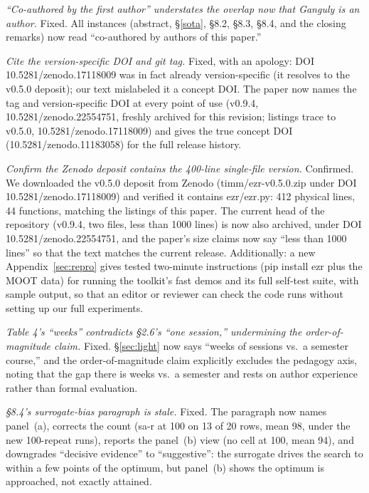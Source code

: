 \documentclass[AMA,STIX2COL]{WileyNJDv5}
\begin{document}
\smallskip{} {\em ``Co-authored by the first author''
understates the overlap now that Ganguly is an author.} Fixed.
All instances (abstract, \S\ref{sota}, \S8.2, \S8.3, \S8.4, and
the closing remarks) now read ``co-authored by authors of this
paper.''

\smallskip{} {\em Cite the version-specific DOI and git
tag.} Fixed, with an apology: DOI
\textsf{10.5281/zenodo.17118009} was in fact already
version-specific (it resolves to the \textsf{v0.5.0} deposit);
our text mislabeled it a concept DOI. The paper now names the
tag and version-specific DOI at every point of use
(\textsf{v0.9.4}, \textsf{10.5281/zenodo.22554751}, freshly
archived for this revision; listings trace to \textsf{v0.5.0},
\textsf{10.5281/zenodo.17118009}) and gives the true concept
DOI (\textsf{10.5281/zenodo.11183058}) for the full release
history.

\smallskip{} {\em Confirm the Zenodo deposit contains the
400-line single-file version.} Confirmed. We downloaded the
\textsf{v0.5.0} deposit from Zenodo
(\textsf{timm/ezr-v0.5.0.zip} under DOI
\textsf{10.5281/zenodo.17118009}) and verified it contains
\textsf{ezr/ezr.py}: 412 physical lines, 44 functions, matching
the listings of this paper. The current head of the repository
(\textsf{v0.9.4}, two files, less than 1000 lines) is now also
archived, under DOI \textsf{10.5281/zenodo.22554751}, and the
paper's size claims now say ``less than 1000 lines'' so that the
text matches the current release. Additionally: a new Appendix~\ref{sec:repro} gives tested
two-minute instructions (\textsf{pip install ezr} plus the MOOT
data) for running the toolkit's fast demos and its full self-test
suite, with sample output, so that an editor or reviewer can
check the code runs without setting up our full experiments.

\smallskip{} {\em Table 4's ``weeks'' contradicts \S2.6's
``one session,'' undermining the order-of-magnitude claim.}
Fixed. \S\ref{sec:light} now says ``weeks of sessions vs.\ a
semester course,'' and the order-of-magnitude claim explicitly
excludes the pedagogy axis, noting that the gap there is weeks
vs.\ a semester and rests on author experience rather than
formal evaluation.

\smallskip{} {\em \S8.4's surrogate-bias paragraph is
stale.} Fixed. The paragraph now names panel~(a), corrects the
count (\textsf{sa-r} at 100 on 13 of 20 rows, mean 98, under the
new 100-repeat runs), reports
the panel~(b) view (no cell at 100, mean 94), and downgrades
``decisive evidence'' to ``suggestive'': the surrogate drives
the search to within a few points of the optimum, but panel~(b)
shows the optimum is approached, not exactly attained.
\end{document}
